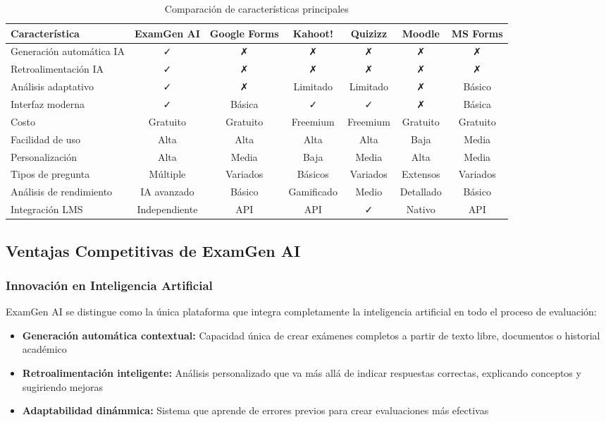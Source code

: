 \documentclass[12pt,a4paper]{report}
\begin{document}
\begin{table}[h]
\centering
\caption{Comparación de características principales}
\begin{tabular}{|l|c|c|c|c|c|c|}
\hline
\textbf{Característica} & \textbf{ExamGen AI} & \textbf{Google Forms} & \textbf{Kahoot!} & \textbf{Quizizz} & \textbf{Moodle} & \textbf{MS Forms} \\
\hline
Generación automática IA & ✓ & ✗ & ✗ & ✗ & ✗ & ✗ \\
\hline
Retroalimentación IA & ✓ & ✗ & ✗ & ✗ & ✗ & ✗ \\
\hline
Análisis adaptativo & ✓ & ✗ & Limitado & Limitado & ✗ & Básico \\
\hline
Interfaz moderna & ✓ & Básica & ✓ & ✓ & ✗ & Básica \\
\hline
Costo & Gratuito & Gratuito & Freemium & Freemium & Gratuito & Gratuito \\
\hline
Facilidad de uso & Alta & Alta & Alta & Alta & Baja & Media \\
\hline
Personalización & Alta & Media & Baja & Media & Alta & Media \\
\hline
Tipos de pregunta & Múltiple & Variados & Básicos & Variados & Extensos & Variados \\
\hline
Análisis de rendimiento & IA avanzado & Básico & Gamificado & Medio & Detallado & Básico \\
\hline
Integración LMS & Independiente & API & API & ✓ & Nativo & API \\
\hline
\end{tabular}
\end{table}

\subsection{Ventajas Competitivas de ExamGen AI}

\subsubsection{Innovación en Inteligencia Artificial}

ExamGen AI se distingue como la única plataforma que integra completamente la inteligencia artificial en todo el proceso de evaluación:

\begin{itemize}
\item \textbf{Generación automática contextual:} Capacidad única de crear exámenes completos a partir de texto libre, documentos o historial académico
\item \textbf{Retroalimentación inteligente:} Análisis personalizado que va más allá de indicar respuestas correctas, explicando conceptos y sugiriendo mejoras
\item \textbf{Adaptabilidad dinámmica:} Sistema que aprende de errores previos para crear evaluaciones más efectivas
\end{itemize}
\end{document}
